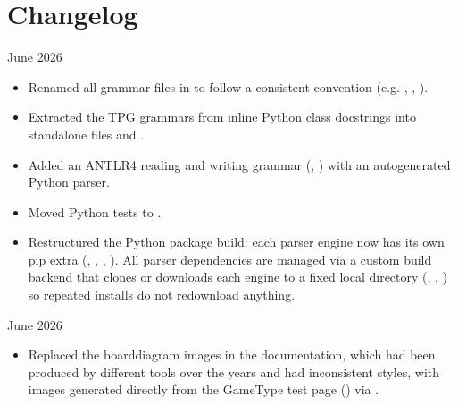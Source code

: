 \documentclass[letterpaper,10pt,english]{sphinxmanual}
\begin{document}
\chapter{Changelog}
\label{\detokenize{changelog:changelog}}\label{\detokenize{changelog::doc}}
 June 2026
\begin{itemize}
\item {} 
\sphinxAtStartPar
Renamed all grammar files in  to follow a consistent
 convention (e.g. ,
, ).

\item {} 
\sphinxAtStartPar
Extracted the TPG grammars from inline Python class docstrings into
standalone files  and
.

\item {} 
\sphinxAtStartPar
Added an ANTLR4 reading and writing grammar
(, )
with an auto\sphinxhyphen{}generated Python parser.

\item {} 
\sphinxAtStartPar
Moved Python tests to .

\item {} 
\sphinxAtStartPar
Restructured the Python package build: each parser engine now has its
own pip extra (\sphinxcode{\sphinxupquote{{[}tpg{]}}}, \sphinxcode{\sphinxupquote{{[}dparser{]}}}, \sphinxcode{\sphinxupquote{{[}antlr4{]}}}, \sphinxcode{\sphinxupquote{{[}grammatica{]}}}).
All parser dependencies are managed via a custom build backend that clones
or downloads each engine to a fixed local directory (,
, ) so repeated installs do not
re\sphinxhyphen{}download anything.

\end{itemize}

 June 2026
\begin{itemize}
\item {} 
\sphinxAtStartPar
Replaced the board\sphinxhyphen{}diagram images in the documentation, which had been
produced by different tools over the years and had inconsistent styles,
with images generated directly from the GameType test page
() via .

\end{itemize}
\end{document}

